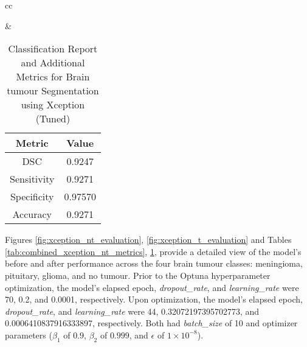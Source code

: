 \begin{table}[ht]
\begin{tabular}{cc}
\begin{minipage}{.6\linewidth}
\begin{subtable}[t]{\linewidth}
                \caption{Classification Report for Brain tumour Segmentation (Tuned)} 
                \label{tab:xception_t_classification_report}
            \end{subtable}
        \end{minipage} &
        \begin{minipage}{.35\linewidth}
            \centering
            \begin{subtable}[t]{\linewidth}
                \centering
                \begin{tabular}{|c|c|}
                    \hline 
                    \textbf{Metric} & \textbf{Value} \\ 
                    \hline
                    DSC & 0.9247 \\ 
                    \hline
                    Sensitivity & 0.9271 \\ 
                    \hline
                    Specificity & 0.97570 \\ 
                    \hline
                    Accuracy & 0.9271 \\ 
                    \hline
                \end{tabular}
                \caption{Additional Metrics for Brain tumour Segmentation (Tuned)} 
                \label{tab:xception_t_additional_metrics}
            \end{subtable}
        \end{minipage}
    \end{tabular}
    \caption{Classification Report and Additional Metrics for Brain tumour Segmentation using Xception (Tuned)}
    \label{tab:combined_xception_t_metrics}
    \end{table}


Figures \ref{fig:xception_nt_evaluation}, \ref{fig:xception_t_evaluation} and Tables \ref{tab:combined_xception_nt_metrics}, \ref{tab:combined_xception_t_metrics}, provide a detailed view of the model's before and after performance across the four brain tumour classes: meningioma, pituitary, glioma, and no tumour. Prior to the Optuna hyperparameter optimization, the model's elapsed epoch, \textit{dropout\_rate}, and \textit{learning\_rate} were 70, 0.2, and 0.0001, respectively. Upon optimization, the model's elapsed epoch, \textit{dropout\_rate}, and \textit{learning\_rate} were 44, 0.32072197395702773, and 0.0006410837916333897, respectively. Both had \textit{batch\_size} of 10 and optimizer parameters ($\beta_1$ of $0.9$, $\beta_2$ of $0.999$, and $\epsilon$ of $1 \times 10^{-8}$).


